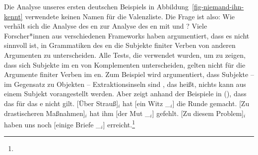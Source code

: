 Die Analyse unseres ersten deutschen Beispiels in Abbildung~\ref{fig-niemand-ihn-kennt} verwendete keinen Namen
für die Valenzliste. Die Frage ist also: Wie verhält sich die Analyse des en zur Analyse des
en mit \spr und \comps? Viele Forscher*innen aus verschiedenen Frameworks haben argumentiert, dass es nicht
sinnvoll ist, in Grammatiken des en die Subjekte finiter Verben von anderen Argumenten zu unterscheiden. Alle Tests, die
verwendet wurden, um zu zeigen, dass sich Subjekte im en von Komplementen unterscheiden, gelten nicht für die Argumente
finiter Verben im en. Zum Beispiel wird argumentiert, dass Subjekte -- im Gegensatz zu Objekten --
Extraktionsinseln sind \parencites[--250]{Chomsky73a}[]{Fanselow87a}[--36]{Grewendorf89a}, das heißt, nichts kann
aus einem Subjekt vorangestellt werden. Aber \citet[]{Haider93a} zeigt anhand der Beispiele in (), dass das für das
e nicht gilt.
\eal
\ex {}[Über Strauß]$_i$ hat [ein Witz \_$_i$] die Runde gemacht.
\ex {}[Zu drastischeren Maßnahmen]$_i$ hat ihm [der Mut \_$_i$] gefehlt.
\ex {}[Zu diesem Problem]$_i$ haben uns noch [einige Briefe \_$_i$] erreicht.\footnote{
}

\zl

